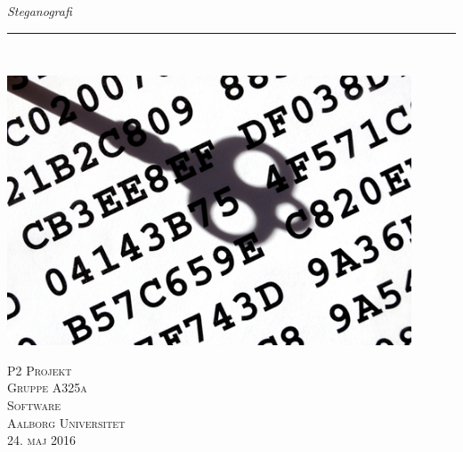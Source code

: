 \thispagestyle{empty}
\begin{flushright}
\vspace{3cm}

\phantom{hul}

\phantom{hul}

\phantom{hul}

\textsl{\Huge Steganografi} \\ \vspace{1cm}

\rule{13cm}{3mm} \\ \vspace{1.5cm}
\vspace{1cm}

\includegraphics[width=0.9\textwidth]{billeder/forside.jpg}

\vspace{2cm} 
\textsc{\Large P2 Projekt \\
Gruppe A325a \\
Software\\
Aalborg Universitet\\
24. maj 2016\\}
\end{flushright}
